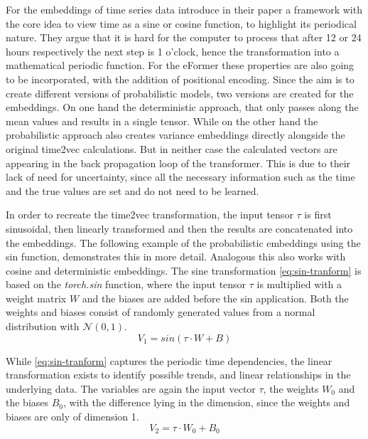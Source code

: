 \documentclass{article}
\begin{document}
For the embeddings of time series data \cite{time2vec} introduce in their paper a framework with the core idea to view time as a sine or cosine function, to highlight its periodical nature. They argue that it is hard for the computer to process that after 12 or 24 hours respectively the next step is 1 o'clock, hence the transformation into a mathematical periodic function. For the eFormer these properties are also going to be incorporated, with the addition of positional encoding.
Since the aim is to create different versions of probabilistic models, two versions are created for the embeddings. On one hand the deterministic approach, that only passes along the mean values and results in a single tensor. While on the other hand the probabilistic approach also creates variance embeddings directly alongside the original time2vec calculations. But in neither case the calculated vectors are appearing in the back propagation loop of the transformer. This is due to their lack of need for uncertainty, since all the necessary information such as the time and the true values are set and do not need to be learned. \par 

In order to recreate the time2vec transformation, the input tensor $\tau$ is first sinusoidal, then linearly transformed and then the results are concatenated into the embeddings. The following example of the probabilistic embeddings using the sin function, demonstrates this in more detail. Analogous this also works with cosine and deterministic embeddings.
The sine transformation \eqref{eq:sin-tranform} is based on the \textit{torch.sin} function, where the input tensor $\tau$ is multiplied with a weight matrix $W$ and the biases are added before the sin application. Both the weights and biases consist of randomly generated values from a normal distribution with $\mathcal{N}(0,1)$.
\begin{equation}\label{eq:sin-tranform}
    V_1 = sin(\tau \cdot W + B)
\end{equation}
    
While \eqref{eq:sin-tranform} captures the periodic time dependencies, the linear transformation exists to identify possible trends, and linear relationships in the underlying data. The variables are again the input vector $\tau$, the weights $W_0$ and the biases $B_0$, with the difference lying in the dimension, since the weights and biases are only of dimension 1.    
\begin{equation}\label{eq:lin-tranform}
    V_2 = \tau \cdot W_0 + B_0
\end{equation}
\end{document}
